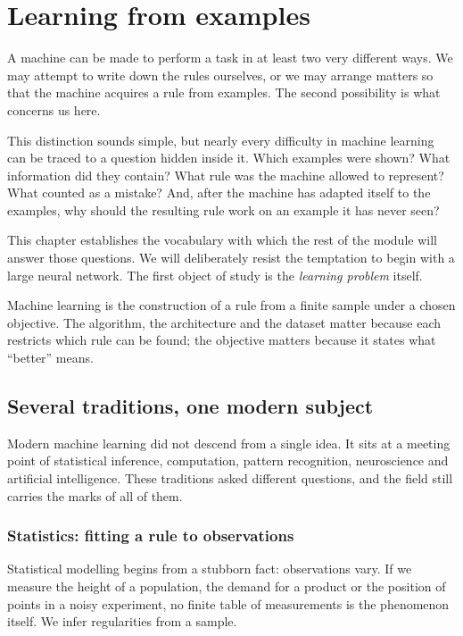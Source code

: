 \chapter{Learning from examples}
\label{chap:week01}

A machine can be made to perform a task in at least two very different ways. We may attempt to write down the rules ourselves, or we may arrange matters so that the machine acquires a rule from examples. The second possibility is what concerns us here.

This distinction sounds simple, but nearly every difficulty in machine learning can be traced to a question hidden inside it. Which examples were shown? What information did they contain? What rule was the machine allowed to represent? What counted as a mistake? And, after the machine has adapted itself to the examples, why should the resulting rule work on an example it has never seen?

This chapter establishes the vocabulary with which the rest of the module will answer those questions. We will deliberately resist the temptation to begin with a large neural network. The first object of study is the \emph{learning problem} itself.

\begin{keyidea}
Machine learning is the construction of a rule from a finite sample under a chosen objective. The algorithm, the architecture and the dataset matter because each restricts which rule can be found; the objective matters because it states what ``better'' means.
\end{keyidea}

\section{Several traditions, one modern subject}

Modern machine learning did not descend from a single idea. It sits at a meeting point of statistical inference, computation, pattern recognition, neuroscience and artificial intelligence. These traditions asked different questions, and the field still carries the marks of all of them.

\subsection{Statistics: fitting a rule to observations}

Statistical modelling begins from a stubborn fact: observations vary. If we measure the height of a population, the demand for a product or the position of points in a noisy experiment, no finite table of measurements is the phenomenon itself. We infer regularities from a sample.

